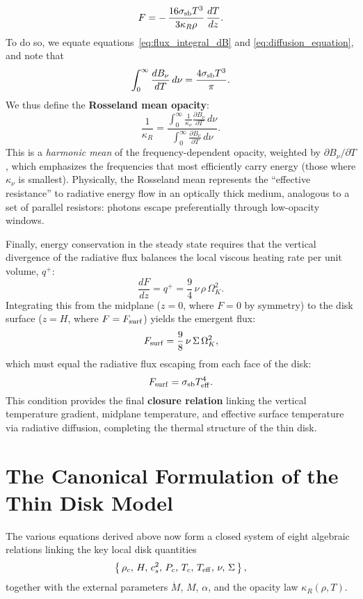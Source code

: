 \begin{equation}
F = -\,\frac{16\sigma_{\rm sb} T^3}{3\kappa_R\rho}\,\frac{dT}{dz}.
\label{eq:diffusion_equation}
\end{equation}
To do so, we equate equations~\eqref{eq:flux_integral_dB} and \eqref{eq:diffusion_equation}, and note that
\[
\int_0^\infty \frac{dB_\nu}{dT}\,d\nu = \frac{4\sigma_{\rm sb}T^3}{\pi}.
\]
We thus define the \textbf{Rosseland mean opacity}:
\begin{equation}
\boxed{
\frac{1}{\kappa_R} =
\frac{\displaystyle \int_0^\infty \frac{1}{\kappa_\nu}
\frac{\partial B_\nu}{\partial T}\,d\nu}
{\displaystyle \int_0^\infty \frac{\partial B_\nu}{\partial T}\,d\nu}.
}
\label{eq:rosseland_mean}
\end{equation}
This is a \emph{harmonic mean} of the frequency-dependent opacity, weighted by $\partial B_\nu/\partial T$, which emphasizes the frequencies that most efficiently carry energy (those where $\kappa_\nu$ is smallest).  
Physically, the Rosseland mean represents the ``effective resistance'' to radiative energy flow in an optically thick medium, analogous to a set of parallel resistors: photons escape preferentially through low-opacity windows.
\par
Finally, energy conservation in the steady state requires that the vertical divergence of the radiative flux balances the local viscous heating rate per unit volume, $q^+$:
\begin{equation}
\frac{dF}{dz} = q^+ = \frac{9}{4}\,\nu\,\rho\,\Omega_K^2.
\end{equation}
Integrating this from the midplane ($z=0$, where $F=0$ by symmetry) to the disk surface ($z=H$, where $F=F_{\rm surf}$) yields the emergent flux:
\[
F_{\rm surf} = \frac{9}{8}\,\nu\,\Sigma\,\Omega_K^2,
\]
which must equal the radiative flux escaping from each face of the disk:
\begin{equation}
F_{\rm surf} = \sigma_{\rm sb}T_{\rm eff}^4.
\end{equation}
This condition provides the final \textbf{closure relation} linking the vertical temperature gradient, midplane temperature, and effective surface temperature via radiative diffusion, completing the thermal structure of the thin disk.

\section{The Canonical Formulation of the Thin Disk Model}

The various equations derived above now form a closed system of eight algebraic relations linking the key local disk quantities
\[
\left\{\,\rho_c,\,H,\,c_s^2,\,P_c,\,T_c,\,T_{\rm eff},\,\nu,\,\Sigma\,\right\},
\]
together with the external parameters $\dot{M}$, $M$, $\alpha$, and the opacity law $\kappa_R(\rho, T)$.

